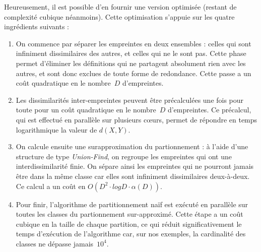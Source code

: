 Heureusement, il est possible d'en fournir une version optimisée
(restant de complexité cubique néanmoins). Cette optimisation
s'appuie sur les quatre ingrédients suivants :

\begin{enumerate}
\item
  On commence par séparer les empreintes en deux ensembles : celles
  qui sont infiniment dissimilaires des autres, et celles qui ne le
  sont pas. Cette phase permet d'éliminer les définitions qui ne
  partagent absolument rien avec les autres, et sont donc exclues de
  toute forme de redondance. Cette passe a un coût quadratique en le
  nombre~$D$ d'empreintes.
\item
  Les dissimilarités inter-empreintes peuvent être précalculées une
  fois pour toute pour un coût quadratique en le nombre~$D$
  d'empreintes.  Ce précalcul, qui est effectué en parallèle sur
  plusieurs c{\oe}urs, permet de répondre en temps logarithmique
  la valeur de $d(X, Y)$.
\item
  On calcule ensuite une surapproximation du partionnement : à l'aide
  d'une structure de type \textit{Union-Find}, on regroupe les
  empreintes qui ont une interdissimilarité finie. On sépare ainsi
  les empreintes qui ne pourront jamais être dans la même classe car
  elles sont infiniment dissimilaires deux-à-deux. Ce calcul a un coût
  en $O(D^2 \cdot log D \cdot \alpha(D))$. 
\item
  Pour finir, l'algorithme de partitionnement naïf est exécuté en
  parallèle sur toutes les classes du partionnement sur-approximé.
  Cette étape a un coût cubique en la taille de chaque partition, ce
  qui réduit significativement le temps d'exécution de l'algorithme
  car, sur nos exemples, la cardinalité des classes ne dépasse
  jamais~$10^4$.

\end{enumerate}
